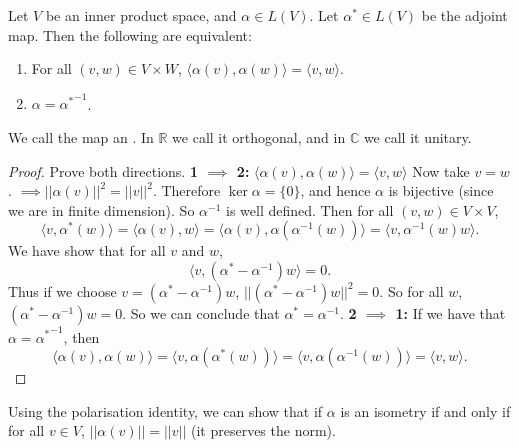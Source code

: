 \documentclass[egregdoesnotlikesansseriftitles,a4paper]{scrartcl}
\begin{document}
\begin{proposition}
     Let $V$ be an inner product space, and $\alpha \in L (V)$. Let $\alpha^* \in L (V)$ be the adjoint map. Then the following are equivalent:
     \begin{enumerate}
          \item For all $(v,w) \in V \times W$, $\langle \alpha (v), \alpha (w)\rangle =\langle v,w \rangle $.
          \item $\alpha={\alpha^*}^{-1}$.
     \end{enumerate}
     We call the map an . In $\mathbb{R}$ we call it orthogonal, and in $\mathbb{C}$ we call it unitary.
\end{proposition}
\begin{proof}
      Prove both directions.\newline 
      \textbf{1 $\implies$ 2:}\newline 
      $\langle \alpha (v), \alpha (w) \rangle =\langle v,w \rangle$ 
      Now take $v=w$. $\implies ||\alpha (v)||^2=||v||^2$. Therefore $\operatorname{ker} \alpha=\{0\}$, and hence $\alpha$ is bijective (since we are in finite dimension). So ${\alpha}^{-1}$ is well defined. Then for all $(v,w)\in V \times V$, 
      \[\langle v,\alpha^* (w) \rangle =\langle \alpha (v), w \rangle =\langle \alpha (v), \alpha ({\alpha}^{-1}(w)) \rangle =\langle v,{\alpha}^{-1}(w)w \rangle .\]
      We have show that for all $v$ and $w$, 
      \[\langle v, (\alpha^* - {\alpha}^{-1})w \rangle =0.\]
      Thus if we choose $v=(\alpha^* - {\alpha}^{-1})w$, $||(\alpha^* - {\alpha}^{-1})w||^2=0$. So for all $w$, $(\alpha^* - {\alpha}^{-1})w=0$. So we can conclude that $\alpha^*={\alpha}^{-1}$.\newline 
      \textbf{2 $\implies$ 1:}\newline 
     If we have that $\alpha={\alpha^*}^{-1}$, then 
     \[\langle \alpha (v), \alpha (w) \rangle =\langle v, \alpha (\alpha^* (w)) \rangle=\langle v, \alpha ({\alpha}^{-1} (w)) \rangle= \langle v,w \rangle.\]
\end{proof}
\begin{remark}
      Using the polarisation identity, we can show that if $\alpha$ is an isometry if and only if for all $v \in V$, $||\alpha (v)||=||v||$ (it preserves the norm).
\end{remark}
\end{document}
